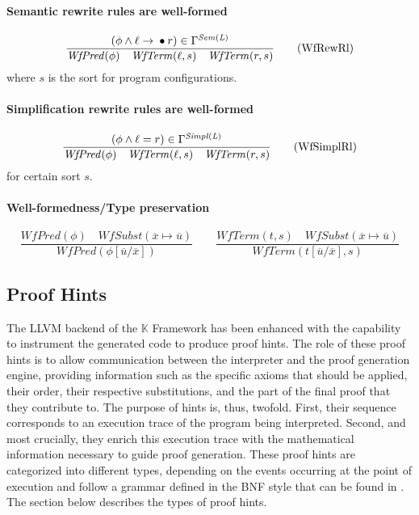 \documentclass{article}
\theoremstyle{plain}
\theoremstyle{definition}
\newcommand{\K}{$\mathbb{K}$\xspace}
\newcommand{\WfTerm}{\ensuremath{\mathit{WfTerm}}}
\newcommand{\WfSubst}{\ensuremath{\mathit{WfSubst}}}
\newcommand{\WfPred}{\ensuremath{\mathit{WfPred}}}
\begin{document}
\paragraph{Semantic rewrite rules are well-formed}

\[
\dfrac
{(\phi \land \ell \rightarrow {}\bullet{}  r) \in \Gamma^{\it Sem(L)}}
{\WfPred(\phi) \quad \WfTerm(\ell, s) \quad \WfTerm(r, s)} \tag{WfRewRl}\label{eq:WfRewRl}
\]
where $s$ is the sort for program configurations.

\paragraph{Simplification rewrite rules are well-formed}

\[
\dfrac
{(\phi \land \ell =  r) \in \Gamma^{\it Simpl(L)}}
{\WfPred(\phi) \quad \WfTerm(\ell, s) \quad \WfTerm(r, s)} \tag{WfSimplRl}\label{eq:WfSimplRl}
\]
for certain sort $s$.

\paragraph{Well-formedness/Type preservation}

\[
\dfrac
{\WfPred(\phi) \quad \WfSubst(\overline{x}\mapsto \overline{u})}
{\WfPred(\phi[\overline{u}/\overline{x}])}
\qquad
\dfrac
{\WfTerm(t, s) \quad \WfSubst(\overline{x}\mapsto \overline{u})}
{\WfTerm(t[\overline{u}/\overline{x}], s)} \tag{WfPres}\label{eq:WfPres}
\]

\subsection{Proof Hints} \label{sec:proof_hints}


The LLVM backend of the \K Framework has been enhanced with the capability to instrument the generated code to produce proof hints. The role of these proof hints is to allow communication between the interpreter and the proof generation engine, providing information such as the specific axioms that should be applied, their order, their respective substitutions, and the part of the final proof that they contribute to. The purpose of hints is, thus, twofold. First, their sequence corresponds to an execution trace of the program being interpreted. Second, and most crucially, they enrich this execution trace with the mathematical information necessary to guide proof generation. These proof hints are categorized into different types, depending on the events occurring at the point of execution and follow a grammar defined in the BNF style that can be found in \cite{proof-hints-doc}. The section below describes the types of proof hints.
\end{document}
